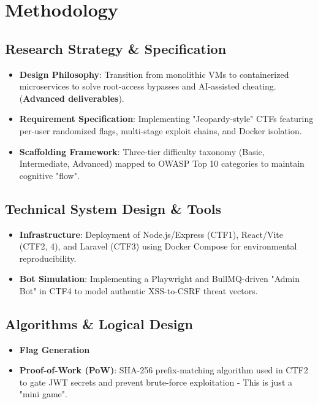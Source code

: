 \section{Methodology}
\subsection{Research Strategy \& Specification}



\begin{itemize}
\item \textbf{Design Philosophy}: Transition from monolithic VMs to containerized microservices to solve root-access bypasses and AI-assisted cheating. (\textbf{Advanced deliverables}).
\item \textbf{Requirement Specification}: Implementing "Jeopardy-style" CTFs featuring per-user randomized flags, multi-stage exploit chains, and Docker isolation.
\item \textbf{Scaffolding Framework}: Three-tier difficulty taxonomy (Basic, Intermediate, Advanced) mapped to OWASP Top 10 categories to maintain cognitive "flow".
\end{itemize}

\subsection{Technical System Design \& Tools}
\begin{itemize}
\item \textbf{Infrastructure}: Deployment of Node.js/Express (CTF1), React/Vite (CTF2, 4), and Laravel (CTF3) using Docker Compose for environmental reproducibility.
\item \textbf{Bot Simulation}: Implementing a Playwright and BullMQ-driven "Admin Bot" in CTF4 to model authentic XSS-to-CSRF threat vectors.
\end{itemize}

\subsection{Algorithms \& Logical Design}
\begin{itemize}
\item \textbf{Flag Generation}
\item \textbf{Proof-of-Work (PoW)}: SHA-256 prefix-matching algorithm used in CTF2 to gate JWT secrets and prevent brute-force exploitation - This is just a "mini game".
\end{itemize}

